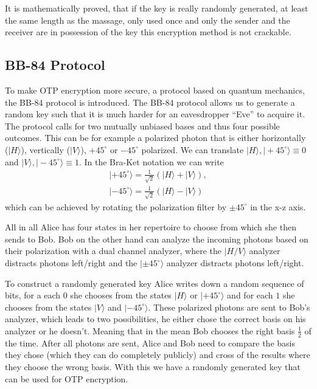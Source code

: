 \documentclass[a4paper]{article}
\begin{document}
It is mathematically proved, that if the key is really randomly generated, at
least the same length as the massage, only used once and only the sender and
the receiver are in possession of the key this encryption method is not
crackable.

\subsection{BB-84 Protocol}
To make OTP encryption more secure, a protocol based on quantum mechanics, the
BB-84 protocol is introduced. The BB-84 protocol allows us to generate a random key such that
it is much harder for an eavesdropper ``Eve'' to acquire it. The protocol calls for two
mutually unbiased bases and thus four possible outcomes.
This can be for example a polarized photon that is either
horizontally ($|H\rangle$), vertically ($|V\rangle$), $+45^\circ$ or
$-45^\circ$ polarized. We can translate $|H\rangle, |+45^\circ\rangle \equiv 0$ and
$|V\rangle, |-45^\circ\rangle \equiv 1$.  In the Bra-Ket notation we can write
\begin{align}
        |+45^\circ\rangle = \frac{1}{\sqrt{2}}(|H\rangle + |V\rangle),\\
        |-45^\circ\rangle = \frac{1}{\sqrt{2}}(|H\rangle - |V\rangle)
\end{align}
which can be achieved by rotating the polarization filter by $\pm 45^\circ$ in
the x-z axis.

All in all Alice has four states in her repertoire to choose from which
she then sends to Bob. Bob on the other hand can analyze the incoming photons
based on their polarization with a dual channel analyzer, where the $|H/V\rangle$
analyzer distracts photons left/right and the $|\pm45^\circ\rangle$ analyzer distracts
photons left/right.

To construct a randomly generated key Alice writes down
a random sequence of bits, for a each $0$ she chooses from the states $|H\rangle$ or
$|+45^\circ\rangle$ and for each $1$ she chooses from the states $|V\rangle$
and $|-45^\circ\rangle$. These polarized photons are sent to Bob's analyzer,
which leads to two possibilities, he either chose the correct basis on his
analyzer or he doesn't. Meaning that in the mean Bob chooses the right basis
$\frac{1}{2}$ of the time. After all photons are sent, Alice and Bob need to compare
the basis they chose (which they can do completely publicly) and cross of the
results where they choose the wrong basis. With this we have a randomly
generated key that can be used for OTP encryption.
\end{document}
